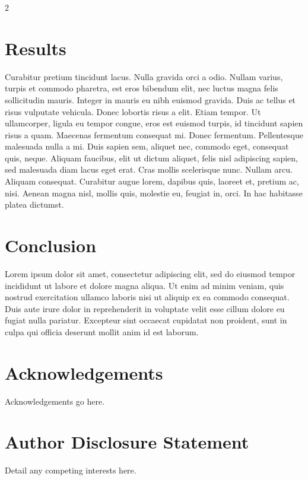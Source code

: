\documentclass[12pt,a4paper,twoside]{article}
\begin{document}
\begin{multicols}{2}
\section{Results}
Curabitur pretium tincidunt lacus. Nulla gravida orci a odio. Nullam varius, turpis et commodo pharetra, est eros bibendum elit, nec luctus magna felis sollicitudin mauris. Integer in mauris eu nibh euismod gravida. Duis ac tellus et risus vulputate vehicula. Donec lobortis risus a elit. Etiam tempor. Ut ullamcorper, ligula eu tempor congue, eros est euismod turpis, id tincidunt sapien risus a quam. Maecenas fermentum consequat mi. Donec fermentum. Pellentesque malesuada nulla a mi. Duis sapien sem, aliquet nec, commodo eget, consequat quis, neque. Aliquam faucibus, elit ut dictum aliquet, felis nisl adipiscing sapien, sed malesuada diam lacus eget erat. Cras mollis scelerisque nunc. Nullam arcu. Aliquam consequat. Curabitur augue lorem, dapibus quis, laoreet et, pretium ac, nisi. Aenean magna nisl, mollis quis, molestie eu, feugiat in, orci. In hac habitasse platea dictumst.


\section{Conclusion}
Lorem ipsum dolor sit amet, consectetur adipiscing elit, sed do eiusmod tempor incididunt ut labore et dolore magna aliqua. Ut enim ad minim veniam, quis nostrud exercitation ullamco laboris nisi ut aliquip ex ea commodo consequat. Duis aute irure dolor in reprehenderit in voluptate velit esse cillum dolore eu fugiat nulla pariatur. Excepteur sint occaecat cupidatat non proident, sunt in culpa qui officia deserunt mollit anim id est laborum.


\section*{Acknowledgements} 
Acknowledgements go here.


\section*{Author Disclosure Statement}
Detail any competing interests here.






\end{multicols}
\end{document}
